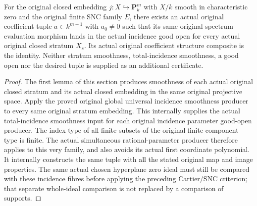 \begin{theorem}
\label{thm:kn-nadel-bertini-snc-all-strata-parameters}
\leanok
For the original closed embedding $j:X\hookrightarrow\mathbf P^m_k$ with
$X/k$ smooth in characteristic zero and the original finite SNC family $E$,
there exists an actual original coefficient tuple $a\in k^{m+1}$ with
$a_0\ne0$ such that its same original spectrum evaluation morphism lands
in the actual incidence good open for every actual original closed stratum
$X_s$.  Its actual original coefficient structure composite is the identity.
Neither stratum smoothness, total-incidence smoothness, a good open nor the
desired tuple is supplied as an additional certificate.
\end{theorem}
\begin{proof}
The first lemma of this section produces smoothness of each actual
original closed stratum and its actual closed embedding in the same
original projective space.  Apply the proved original global universal
incidence smoothness producer to every same original stratum embedding.
This internally supplies the actual total-incidence smoothness input for
each original incidence parameter good-open producer.  The index type of
all finite subsets of the original finite component type is finite.
The actual simultaneous rational-parameter producer therefore applies to
this very family, and also avoids its actual first coordinate polynomial.
It internally constructs the same tuple with all the stated original map
and image properties.  The same actual chosen hyperplane zero ideal must
still be compared with these incidence fibres before applying the preceding
Cartier/SNC criterion; that separate whole-ideal comparison is not replaced
by a comparison of supports.
\end{proof}


